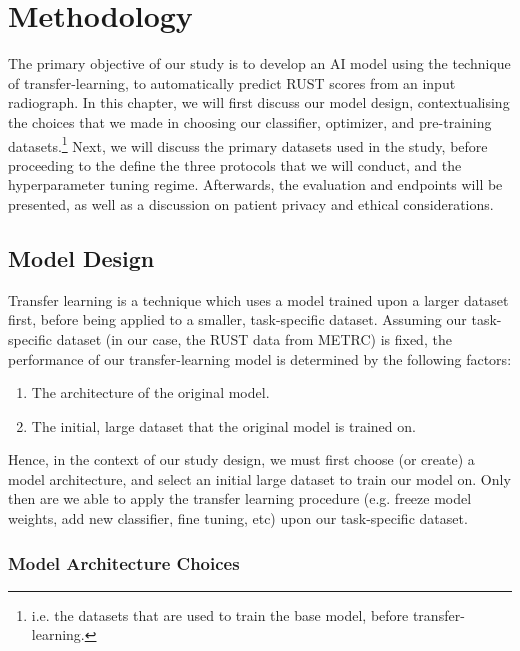 
\chapter{Methodology}

The primary objective of our study is to develop an AI model using the technique of transfer-learning, to automatically predict RUST scores from an input radiograph. In this chapter, we will first discuss our model design, contextualising the choices that we made in choosing our classifier, optimizer, and pre-training datasets.\footnote{i.e. the datasets that are used to train the base model, before transfer-learning.} Next, we will discuss the primary datasets used in the study, before proceeding to the define the three protocols that we will conduct, and the hyperparameter tuning regime. Afterwards, the evaluation and endpoints will be presented, as well as a discussion on patient privacy and ethical considerations.

\section{Model Design}

Transfer learning is a technique which uses a model trained upon a larger dataset first, before being applied to a smaller, task-specific dataset. Assuming our task-specific dataset (in our case, the RUST data from METRC) is fixed, the performance of our transfer-learning model is determined by the following factors:

\begin{enumerate}
    \item The architecture of the original model.
    \item The initial, large dataset that the original model is trained on.
\end{enumerate}

\noindent
Hence, in the context of our study design, we must first choose (or create) a model architecture, and select an initial large dataset to train our model on. Only then are we able to apply the transfer learning procedure (e.g. freeze model weights, add new classifier, fine tuning, etc) upon our task-specific dataset.

\subsection{Model Architecture Choices}

